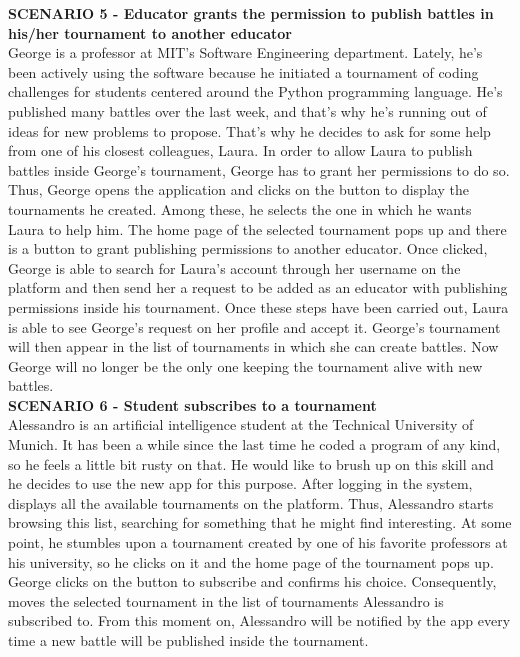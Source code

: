 	\textbf{SCENARIO 5 - Educator grants the permission to publish battles in his/her tournament to another educator}\\
	George is a professor at MIT's Software Engineering department. Lately, he's been actively using the \app software because he initiated a tournament of coding challenges for students centered around the Python programming language. He's published many battles over the last week, and that's why he's running out of ideas for new problems to propose. That's why he decides to ask for some help from one of his closest colleagues, Laura. In order to allow Laura to publish battles inside George's tournament, George has to grant her permissions to do so. Thus, George opens the \app application and clicks on the button to display the tournaments he created. Among these, he selects the one in which he wants Laura to help him. The home page of the selected tournament pops up and there is a button to grant publishing permissions to another educator. Once clicked, George is able to search for Laura's account through her username on the platform and then send her a request to be added as an educator with publishing permissions inside his tournament. Once these steps have been carried out, Laura is able to see George's request on her profile and accept it. George's tournament will then appear in the list of tournaments in which she can create battles. Now George will no longer be the only one keeping the tournament alive with new battles.\\

    \textbf{SCENARIO 6 - Student subscribes to a tournament}\\
    Alessandro is an artificial intelligence student at the Technical University of Munich. It has been a while since the last time he coded a program of any kind, so he feels a little bit rusty on that. He would like to brush up on this skill and he decides to use the new app \app for this purpose.
    After logging in the system, \app displays all the available tournaments on the platform. Thus, Alessandro starts browsing this list, searching for something that he might find interesting. 
    At some point, he stumbles upon a tournament created by one of his favorite professors at his university, so he clicks on it and the home page of the tournament pops up. George clicks on the button to subscribe and confirms his choice. Consequently, \app moves the selected tournament in the list of tournaments Alessandro is subscribed to.
    From this moment on, Alessandro will be notified by the \app app every time a new battle will be published inside the tournament.\\

